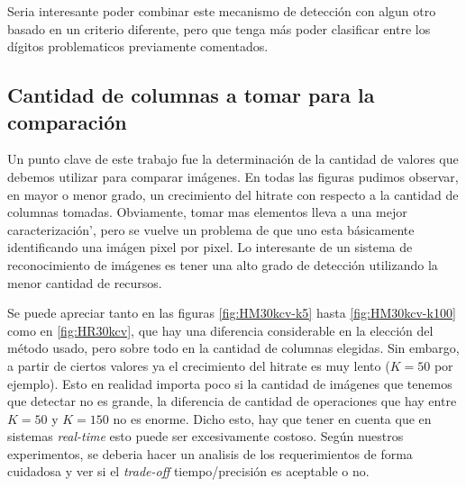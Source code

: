 Seria interesante poder combinar este mecanismo de detecci\'on con algun otro basado en un
criterio diferente, pero que tenga m\'as poder clasificar entre los d\'igitos problematicos
previamente comentados.


\subsection{Cantidad de columnas a tomar para la comparaci\'on}
Un punto clave de este trabajo fue la determinaci\'on de la cantidad de valores que debemos
utilizar para comparar im\'agenes. En todas las figuras pudimos observar, en mayor o menor
grado, un crecimiento del hitrate con respecto a la cantidad de columnas tomadas.
Obviamente, tomar mas elementos lleva a una mejor caracterizaci\'on', pero se vuelve un problema
de que uno esta b\'asicamente identificando una im\'agen pixel por pixel. Lo interesante de un
sistema de reconocimiento de im\'agenes es tener una alto grado de detecci\'on utilizando la menor
cantidad de recursos.


Se puede apreciar tanto en las figuras \ref{fig:HM30kcv-k5} hasta \ref{fig:HM30kcv-k100} como
en \ref{fig:HR30kcv}, que hay una diferencia considerable en la elecci\'on del m\'etodo usado,
pero sobre todo en la cantidad de columnas elegidas. Sin embargo, a partir de ciertos valores
ya el crecimiento del hitrate es muy lento ($K=50$ por ejemplo). Esto en realidad importa poco
si la cantidad de im\'agenes que tenemos que detectar no es grande, la diferencia de cantidad
de operaciones que hay entre $K=50$ y $K=150$ no es enorme. Dicho esto, hay que tener en cuenta que
en sistemas \textit{real-time} esto puede ser excesivamente costoso. Seg\'un nuestros experimentos,
se deberia hacer un analisis de los requerimientos de forma cuidadosa y ver si el \textit{trade-off} tiempo/precisi\'on
es aceptable o no.